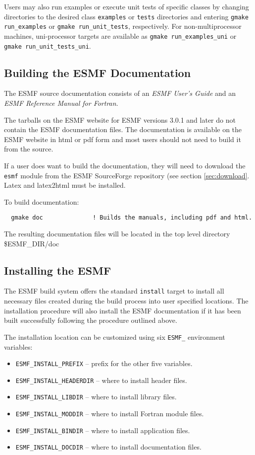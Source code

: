 Users may also run examples or execute unit tests of specific classes
by changing directories to the desired class {\tt examples} or {\tt tests} 
directories and entering {\tt gmake run\_examples} or 
{\tt gmake run\_unit\_tests}, respectively.  For non-multiprocessor machines,
uni-processor targets are available as {\tt gmake run\_examples\_uni} or
{\tt gmake run\_unit\_tests\_uni}.

\subsection{Building the ESMF Documentation}
\label{BuildDocumentation}

The ESMF source documentation consists of an {\it ESMF User's Guide}
and an {\it ESMF Reference Manual for Fortran}.

The tarballs on the ESMF website for ESMF versions 3.0.1 and later do
not contain the ESMF documentation files.  The documentation is 
available on the ESMF website in html or pdf form and most users should
not need to build it from the source.

If a user does want to build the documentation, they will need to 
download the {\tt esmf} module from the ESMF SourceForge repository
(see section \ref{sec:download}.  Latex and latex2html must be
installed.

\noindent To build documentation:
\begin{verbatim}
  gmake doc              ! Builds the manuals, including pdf and html.
\end{verbatim}

\noindent The resulting documentation files will be
located in the top level directory \${ESMF\_DIR}/doc

\subsection{Installing the ESMF}
\label{InstallESMF}

The ESMF build system offers the standard {\tt install} target to install all
necessary files created during the build process into user specified locations.
The installation procedure will also install the ESMF documentation if it has
been built successfully following the procedure outlined above.

The installation location can be customized using six {\tt ESMF\_} environment
variables:
\begin{itemize}
\item {\tt ESMF\_INSTALL\_PREFIX} -- prefix for the other five variables.
\item {\tt ESMF\_INSTALL\_HEADERDIR} -- where to install header files.
\item {\tt ESMF\_INSTALL\_LIBDIR} -- where to install library files.
\item {\tt ESMF\_INSTALL\_MODDIR} -- where to install Fortran module files.
\item {\tt ESMF\_INSTALL\_BINDIR} -- where to install application files.
\item {\tt ESMF\_INSTALL\_DOCDIR} -- where to install documentation files.
\end{itemize}

